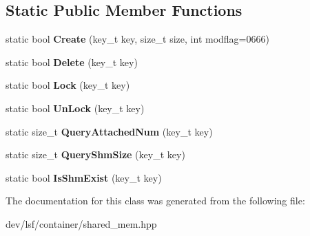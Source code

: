 \subsection*{Static Public Member Functions}
\begin{DoxyCompactItemize}
\item 
\hypertarget{classlsf_1_1container_1_1SharedMem_a323c1358f8906774fe5b15012ec2398d}{
static bool {\bfseries Create} (key\_\-t key, size\_\-t size, int modflag=0666)}
\label{classlsf_1_1container_1_1SharedMem_a323c1358f8906774fe5b15012ec2398d}

\item 
\hypertarget{classlsf_1_1container_1_1SharedMem_a6662b10bf4df2a546966ed079fce621f}{
static bool {\bfseries Delete} (key\_\-t key)}
\label{classlsf_1_1container_1_1SharedMem_a6662b10bf4df2a546966ed079fce621f}

\item 
\hypertarget{classlsf_1_1container_1_1SharedMem_a1d118630009dc3945a38b4f54a3f8c7a}{
static bool {\bfseries Lock} (key\_\-t key)}
\label{classlsf_1_1container_1_1SharedMem_a1d118630009dc3945a38b4f54a3f8c7a}

\item 
\hypertarget{classlsf_1_1container_1_1SharedMem_a668dacd1204e79a48aaf9a2d2649c0e9}{
static bool {\bfseries UnLock} (key\_\-t key)}
\label{classlsf_1_1container_1_1SharedMem_a668dacd1204e79a48aaf9a2d2649c0e9}

\item 
\hypertarget{classlsf_1_1container_1_1SharedMem_a71114d67921266eeebd39afa1133896b}{
static size\_\-t {\bfseries QueryAttachedNum} (key\_\-t key)}
\label{classlsf_1_1container_1_1SharedMem_a71114d67921266eeebd39afa1133896b}

\item 
\hypertarget{classlsf_1_1container_1_1SharedMem_a745b76e0f82f89eff06b3b3f1914a7d9}{
static size\_\-t {\bfseries QueryShmSize} (key\_\-t key)}
\label{classlsf_1_1container_1_1SharedMem_a745b76e0f82f89eff06b3b3f1914a7d9}

\item 
\hypertarget{classlsf_1_1container_1_1SharedMem_ad2f09518544b9184f711ba544d7965b3}{
static bool {\bfseries IsShmExist} (key\_\-t key)}
\label{classlsf_1_1container_1_1SharedMem_ad2f09518544b9184f711ba544d7965b3}

\end{DoxyCompactItemize}


The documentation for this class was generated from the following file:\begin{DoxyCompactItemize}
\item 
dev/lsf/container/shared\_\-mem.hpp\end{DoxyCompactItemize}
